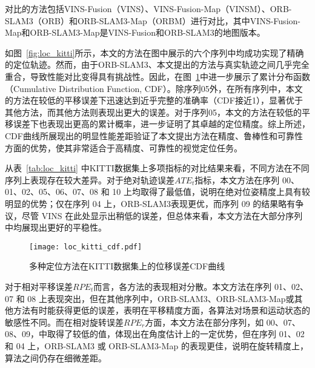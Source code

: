 对比的方法包括VINS-Fusion（VINS）、VINS-Fusion-Map（VINSM）、ORB-SLAM3（ORB）和ORB-SLAM3-Map（ORBM）进行对比，其中VINS-Fusion-Map和ORB-SLAM3-Map是VINS-Fusion和ORB-SLAM3的地图版本。

如图~\ref{fig:loc_kitti}所示，本文的方法在图中展示的六个序列中均成功实现了精确的定位轨迹。然而，由于ORB-SLAM3、本文提出的方法与真实轨迹之间几乎完全重合，导致性能对比变得具有挑战性。因此，在图~\ref{fig:loc_kitti_cdf}中进一步展示了累计分布函数（Cumulative Distribution Function, CDF）。除序列05外，在所有序列中，本文的方法在较低的平移误差下迅速达到近乎完整的准确率（CDF接近1），显著优于其他方法，而其他方法则表现出更大的误差。对于序列05，本文的方法在较低的平移误差下也表现出更高的累计概率，进一步证明了其卓越的定位精度。综上所述，CDF曲线所展现出的明显性能差距验证了本文提出方法在精度、鲁棒性和可靠性方面的优势，使其非常适合于高精度、可靠性的视觉定位任务。

从表~\ref{tab:loc_kitti} 中KITTI数据集上多项指标的对比结果来看，不同方法在不同序列上表现存在较大差异。对于绝对轨迹误差$ATE_t$指标，本文方法在序列 00、01、02、05、06、07、08 和 10 上均取得了最低值，说明在绝对位姿精度上具有较明显的优势；仅在序列 04 上，ORB-SLAM3表现更优，而序列 09 的结果略有争议，尽管 VINS 在此处显示出稍低的误差，但总体来看，本文方法在大部分序列中均展现出更好的平稳性。

\begin{figure}
  \centering
  \texttt{[image: loc\_kitti\_cdf.pdf]}
  \caption{多种定位方法在KITTI数据集上的位移误差CDF曲线}
  \label{fig:loc_kitti_cdf}
\end{figure}

对于相对平移误差$RPE_t$而言，各方法的表现相对分散。本文方法在序列 01、02、07 和 08 上表现突出，但在其他序列中，ORB-SLAM3、ORB-SLAM3-Map或其他方法有时能获得更低的误差，表明在平移精度方面，各算法对场景和运动状态的敏感性不同。而在相对旋转误差$RPE_r$方面，本文方法在部分序列，如 00、07、08、09，中取得了较低的值，体现出在角度估计上的一定优势，但在序列 01、02 和 04 上，ORB-SLAM3 或 ORB-SLAM3-Map 的表现更佳，说明在旋转精度上，算法之间仍存在细微差距。

